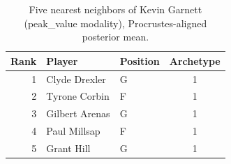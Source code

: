 \begin{table}[htbp]
  \centering\small
  \begin{tabular}{rllc}
    \toprule
    Rank & Player & Position & Archetype \\
    \midrule
    1 & Clyde Drexler & G & 1 \\
    2 & Tyrone Corbin & F & 1 \\
    3 & Gilbert Arenas & G & 1 \\
    4 & Paul Millsap & F & 1 \\
    5 & Grant Hill & G & 1 \\
    \bottomrule
  \end{tabular}
  \caption{Five nearest neighbors of Kevin Garnett (peak_value modality), Procrustes-aligned posterior mean.}
  \label{tab:Kevin_Garnett_neighbors_peak_value}
\end{table}

